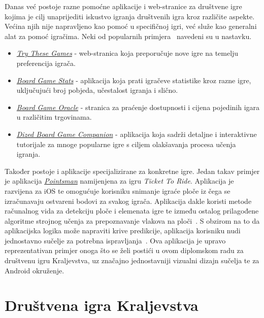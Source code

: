 \documentclass[diplomskirad]{fer}
\begin{document}
	Danas već postoje razne pomoćne aplikacije i web-stranice za društvene igre kojima je cilj unaprijediti iskustvo igranja društvenih igra kroz različite aspekte. Većina njih nije napravljeno kao pomoć u specifičnoj igri, već služe kao generalni alat za pomoć igračima. Neki od popularnih primjera~\cite{BestBoardGameApps} navedeni su u nastavku.
	\begin{itemize}
		\item \href{https://trythesegames.com/}{\textit{Try These Games}} - web-stranica koja preporučuje nove igre na temelju preferencija igrača.
		\item \href{https://www.bgstatsapp.com/}{\textit{Board Game Stats}} - aplikacija koja prati igračeve statistike kroz razne igre, uključujući broj pobjeda, učestalost igranja i slično.
		\item \href{https://www.boardgameoracle.com/}{\textit{Board Game Oracle}} - stranica za praćenje dostupnosti i cijena pojedinih igara u različitim trgovinama.
		\item \href{https://dized.com/}{\textit{Dized Board Game Companion}} - aplikacija koja sadrži detaljne i interaktivne tutorijale za mnoge popularne igre s ciljem olakšavanja procesa učenja igranja.
	\end{itemize}
	
	Također postoje i aplikacije specijalizirane za konkretne igre. Jedan takav primjer je aplikacija \href{https://apps.apple.com/us/app/pointsman/id1447780441}{\textit{Pointsman}} namijenjena za igru \textit{Ticket To Ride}. Aplikacija je razvijena za iOS te omogućuje korisniku snimanje igraće ploče iz čega se izračunavaju ostvareni bodovi za svakog igrača. Aplikacija dakle koristi metode računalnog vida za detekciju ploče i elemenata igre te između ostalog prilagođene algoritme strojnog učenja za prepoznavanje vlakova na ploči~\cite{Pointsman}. S obzirom na to da aplikacijska logika može napraviti krive predikcije, aplikacija korisniku nudi jednostavno sučelje za potrebna ispravljanja~\cite{Pointsman}. Ova aplikacija je upravo reprezentativan primjer onoga što se želi postići u ovom diplomskom radu za društvenu igru Kraljevstva, uz značajno jednostavniji vizualni dizajn sučelja te za Android okruženje. 


\chapter{Društvena igra Kraljevstva}
\label{pog:drustvena_igra}
\end{document}
